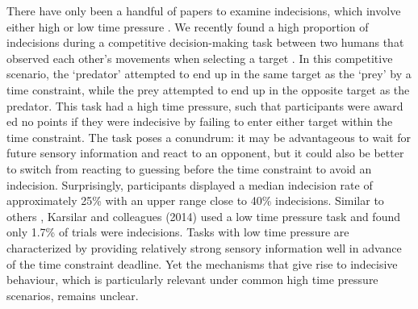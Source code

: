 \documentclass[12pt]{article}
\begin{document}
There have only been a handful of papers to examine indecisions, which involve either high \autocite{lokeshHumansUtilizeSensory2022} or low time pressure \autocite{karsilarSpeedAccuracyTradeoff2014, wuCapacityCognitiveControl2016,philiastidesCausalRoleDorsolateral2011, dambacherTimePressureAffects2015,forstmannStriatumPreSMAFacilitate2008}. We recently found a high proportion of indecisions during a competitive decision-making task between two humans that observed each other’s movements when selecting a target \autocite{lokeshHumansUtilizeSensory2022}. In this competitive scenario, the ‘predator’ attempted to end up in the same target as the ‘prey’ by a time constraint, while the prey attempted to end up in the opposite target as the predator. This task had a high time pressure, such that participants were award ed no points if they were indecisive by failing to enter either target within the time constraint. The task poses a conundrum: it may be advantageous to wait for future sensory information and react to an opponent, but it could also be better to switch from reacting to guessing before the time constraint to avoid an indecision. Surprisingly, participants displayed a median indecision rate of approximately 25\% with an upper range close to 40\% indecisions. Similar to others \autocite{karsilarSpeedAccuracyTradeoff2014, wuCapacityCognitiveControl2016, philiastidesCausalRoleDorsolateral2011, dambacherTimePressureAffects2015,forstmannStriatumPreSMAFacilitate2008}, Karsilar and colleagues (2014) used a low time pressure task and found only 1.7\% of trials were indecisions. Tasks with low time pressure are characterized by providing relatively strong sensory information well in advance of the time constraint deadline. Yet the mechanisms that give rise to indecisive behaviour, which is particularly relevant under common high time pressure scenarios, remains unclear. 
\end{document}
